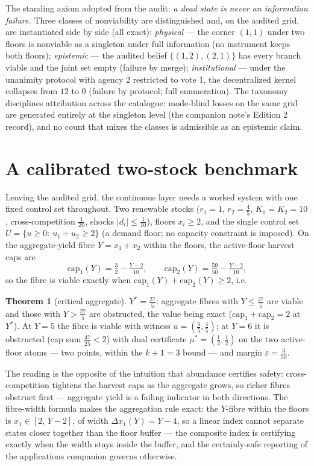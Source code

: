 \documentclass[10pt,twocolumn]{article}
\theoremstyle{definition}
\newtheorem{theorem}{Theorem}
\begin{document}
The standing axiom adopted from the audit: \emph{a dead state is never an
information failure.} Three classes of nonviability are distinguished and,
on the audited grid, are instantiated side by side (all exact):
\emph{physical} --- the corner $(1,1)$ under two floors is nonviable as a
singleton under full information (no instrument keeps both floors);
\emph{epistemic} --- the audited belief $\{(1,2),(2,1)\}$ has every branch
viable and the joint set empty (failure by merge); \emph{institutional}
--- under the unanimity protocol with agency 2 restricted to vote 1, the
decentralized kernel collapses from $12$ to $0$ (failure by protocol;
full enumeration). The taxonomy disciplines attribution across the
catalogue: mode-blind losses on the same grid are generated entirely at
the singleton level (the companion note's Edition 2 record), and no count
that mixes the classes is admissible as an epistemic claim.

\section{A calibrated two-stock benchmark}

Leaving the audited grid, the continuous layer needs a worked system with
one fixed control set throughout. Two renewable stocks
($r_{1} = 1$, $r_{2} = \tfrac45$, $K_{1} = K_{2} = 10$, cross-competition
$\tfrac1{20}$, shocks $|d_{i}| \le \tfrac1{10}$), floors
$x_{i} \ge 2$, and the single control set
$U = \{u \ge 0:\ u_{1} + u_{2} \ge 2\}$ (a demand floor; no capacity
constraint is imposed). On the aggregate-yield fibre
$Y = x_{1} + x_{2}$ within the floors, the active-floor harvest caps are
\[
\mathrm{cap}_{1}(Y) = \tfrac32 - \tfrac{Y-2}{10},\qquad
\mathrm{cap}_{2}(Y) = \tfrac{59}{50} - \tfrac{Y-2}{10},
\]
so the fibre is viable exactly when
$\mathrm{cap}_{1}(Y) + \mathrm{cap}_{2}(Y) \ge 2$, i.e.
\begin{theorem}[critical aggregate]\label{thm:benchmark}
$Y^{*} = \tfrac{27}{5}$: aggregate fibres with $Y \le \tfrac{27}{5}$ are
viable and those with $Y > \tfrac{27}{5}$ are obstructed, the value being
exact ($\mathrm{cap}_{1} + \mathrm{cap}_{2} = 2$ at $Y^{*}$). At
$Y = 5$ the fibre is viable with witness $u = (\tfrac65,\tfrac45)$; at
$Y = 6$ it is obstructed (cap sum $\tfrac{47}{25} < 2$) with dual
certificate $\mu^{*} = (\tfrac12,\tfrac12)$ on the two active-floor
atoms --- two points, within the $k+1 = 3$ bound --- and margin
$\varepsilon = \tfrac{3}{50}$.
\end{theorem}
The reading is the opposite of the intuition that abundance certifies
safety: cross-competition tightens the harvest caps as the aggregate
grows, so richer fibres obstruct first --- aggregate yield is a failing
indicator in both directions. The fibre-width formula makes the
aggregation rule exact: the $Y$-fibre within the floors is
$x_{1} \in [2,\,Y-2]$, of width $\Delta x_{1}(Y) = Y - 4$, so a linear
index cannot separate states closer together than the floor buffer ---
the composite index is certifying exactly when the width stays inside the
buffer, and the certainly-safe reporting of the applications companion
governs otherwise.
\end{document}
